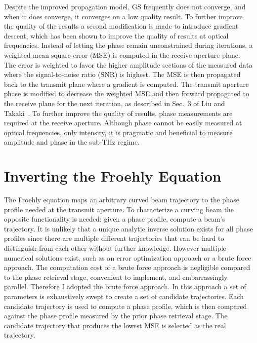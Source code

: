 \documentclass[11pt]{IEEEtran}
\begin{document}
Despite the improved propagation model, GS frequently does not converge, and when it does converge, it converges on a low quality result.
To further improve the quality of the results a second modification is made to introduce gradient descent, which has been shown to improve the quality of results at optical frequencies\cite{mgs_descent}.
Instead of letting the phase remain unconstrained during iterations, a weighted mean square error (MSE) is computed in the receive aperture plane.
The error is weighted to favor the higher amplitude sections of the measured data where the signal-to-noise ratio (SNR) is highest.
The MSE is then propagated back to the transmit plane where a gradient is computed.
The transmit aperture phase is modified to decrease the weighted MSE and then forward propagated to the receive plane for the next iteration, as described in Sec.~3 of Liu and Takaki~\cite{mgs_descent}.
To further improve the quality of results, phase measurements are required at the receive aperture.
Although phase cannot be easily measured at optical frequencies, only intensity, it is pragmatic and beneficial to measure amplitude and phase in the sub-THz regime.


\section{Inverting the Froehly Equation}

The Froehly equation maps an arbitrary curved beam trajectory to the phase profile needed at the transmit aperture\cite{Froehly}.
To characterize a curving beam the opposite functionality is needed: given a phase profile, compute a beam's trajectory.
It is unlikely that a unique analytic inverse solution exists for all phase profiles since there are multiple different trajectories that can be hard to distinguish from each other without further knowledge.
However multiple numerical solutions exist, such as an error optimization approach or a brute force approach.
The computation cost of a brute force approach is negligible compared to the phase retrieval stage, convenient to implement, and embarrassingly parallel.
Therefore I adopted the brute force approach.
In this approach a set of parameters is exhaustively swept to create a set of candidate trajectories.
Each candidate trajectory is used to compute a phase profile, which is then compared against the phase profile measured by the prior phase retrieval stage.
The candidate trajectory that produces the lowest MSE is selected as the real trajectory.
\end{document}
